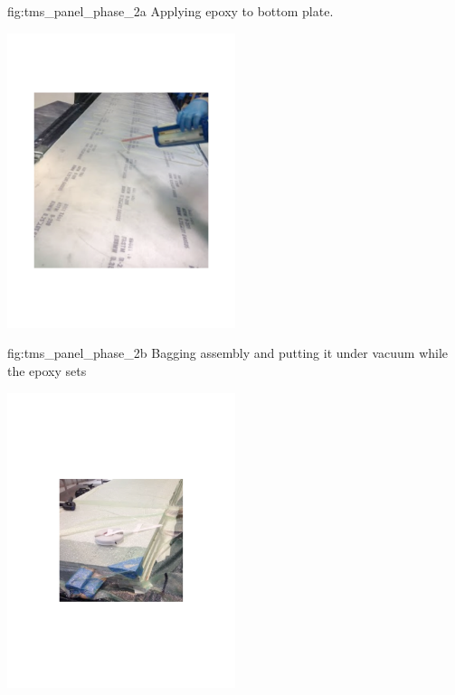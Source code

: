 \begin{dunefigure}{fig:tms_panel_phase_2a}
{Applying epoxy to bottom plate.}
\begin{center}
\includegraphics[width=0.5\textwidth]{graphics/tms/TMS-Other/tms_anl_fig37.pdf}
\end{center}
\end{dunefigure}

\begin{dunefigure}{fig:tms_panel_phase_2b}
{Bagging assembly and putting it under vacuum while the epoxy sets}
\begin{center}
\includegraphics[width=0.5\textwidth]{graphics/tms/TMS-Other/tms_anl_fig41.pdf}
\end{center}
\end{dunefigure}
 
